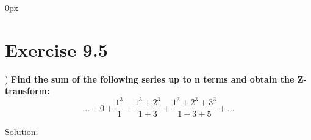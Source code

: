 \documentclass[journal,12pt,twocolumn]{IEEEtran}
\begin{document}
\parindent 0px


\vspace{3cm}

\title{}
\author{EE23BTECH11217 - Prajwal M$^{*}$
}
\maketitle
\newpage
\bigskip

\renewcommand{\thefigure}{\theenumi}
\renewcommand{\thetable}{\theenumi}

\section*{Exercise 9.5}
) \hspace{2pt} \textbf{Find the sum of the following series up to n terms and obtain the Z-transform:}
$$ 
\ldots + 0 + \frac{1^3}{1} + \frac{1^3 + 2^3}{1 + 3} + \frac{1^3 + 2^3 + 3^3}{1 + 3 + 5} + \ldots$$

\noindent Solution: 
\end{document}
